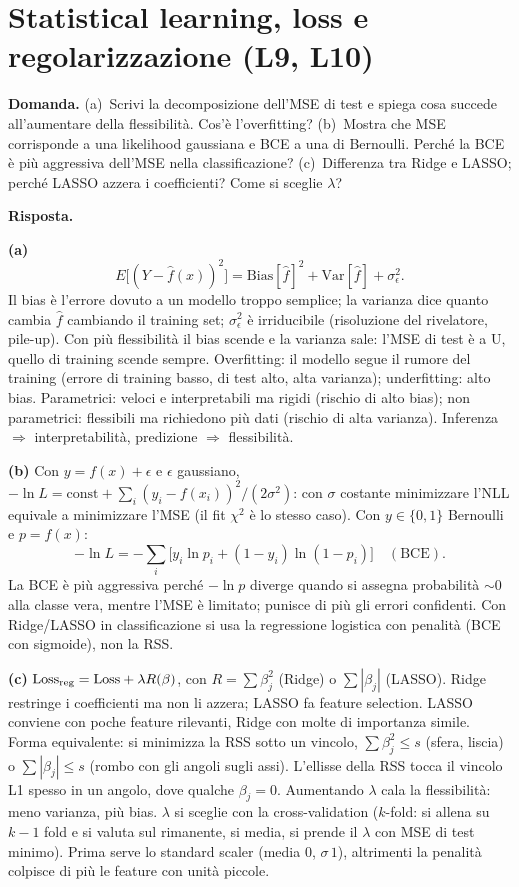 \documentclass[11pt,a4paper]{article}
\newcommand{\Dom}[1]{\par\medskip\noindent\textbf{Domanda.} #1\par\nopagebreak}
\newcommand{\Ris}[1]{\noindent\textbf{Risposta.}\par\nopagebreak #1}
\begin{document}
\section{Statistical learning, loss e regolarizzazione (L9, L10)}

\Dom{(a)~Scrivi la decomposizione dell'MSE di test e spiega cosa succede all'aumentare della flessibilit\`a. Cos'\`e l'overfitting?
(b)~Mostra che MSE corrisponde a una likelihood gaussiana e BCE a una di Bernoulli. Perch\'e la BCE \`e pi\`u aggressiva dell'MSE nella classificazione?
(c)~Differenza tra Ridge e LASSO; perch\'e LASSO azzera i coefficienti? Come si sceglie $\lambda$?}

\Ris{
\textbf{(a)}
\[
E\bigl[(Y-\hat f(x))^2\bigr]=\mathrm{Bias}[\hat f]^2+\mathrm{Var}[\hat f]+\sigma^2_\epsilon .
\]
Il bias \`e l'errore dovuto a un modello troppo semplice; la varianza dice quanto cambia $\hat f$ cambiando il training set; $\sigma^2_\epsilon$ \`e irriducibile (risoluzione del rivelatore, pile-up).
Con pi\`u flessibilit\`a il bias scende e la varianza sale: l'MSE di test \`e a U, quello di training scende sempre.
Overfitting: il modello segue il rumore del training (errore di training basso, di test alto, alta varianza); underfitting: alto bias.
Parametrici: veloci e interpretabili ma rigidi (rischio di alto bias); non parametrici: flessibili ma richiedono pi\`u dati (rischio di alta varianza). Inferenza $\Rightarrow$ interpretabilit\`a, predizione $\Rightarrow$ flessibilit\`a.

\textbf{(b)} Con $y=f(x)+\epsilon$ e $\epsilon$ gaussiano, $-\ln L=\text{const}+\sum_i (y_i-f(x_i))^2/(2\sigma^2)$: con $\sigma$ costante minimizzare l'NLL equivale a minimizzare l'MSE (il fit $\chi^2$ \`e lo stesso caso).
Con $y\in\{0,1\}$ Bernoulli e $p=f(x)$:
\[
-\ln L=-\sum_i\bigl[y_i\ln p_i+(1-y_i)\ln(1-p_i)\bigr]\quad(\text{BCE}).
\]
La BCE \`e pi\`u aggressiva perch\'e $-\ln p$ diverge quando si assegna probabilit\`a $\sim0$ alla classe vera, mentre l'MSE \`e limitato; punisce di pi\`u gli errori confidenti.
Con Ridge/LASSO in classificazione si usa la regressione logistica con penalit\`a (BCE con sigmoide), non la RSS.

\textbf{(c)} $\mathrm{Loss}_{\rm reg}=\mathrm{Loss}+\lambda R(\beta)$, con $R=\sum\beta_j^2$ (Ridge) o $\sum|\beta_j|$ (LASSO).
Ridge restringe i coefficienti ma non li azzera; LASSO fa feature selection. LASSO conviene con poche feature rilevanti, Ridge con molte di importanza simile.
Forma equivalente: si minimizza la RSS sotto un vincolo, $\sum\beta_j^2\le s$ (sfera, liscia) o $\sum|\beta_j|\le s$ (rombo con gli angoli sugli assi). L'ellisse della RSS tocca il vincolo L1 spesso in un angolo, dove qualche $\beta_j=0$.
Aumentando $\lambda$ cala la flessibilit\`a: meno varianza, pi\`u bias.
$\lambda$ si sceglie con la cross-validation ($k$-fold: si allena su $k-1$ fold e si valuta sul rimanente, si media, si prende il $\lambda$ con MSE di test minimo).
Prima serve lo standard scaler (media $0$, $\sigma\,1$), altrimenti la penalit\`a colpisce di pi\`u le feature con unit\`a piccole.
}
\end{document}

